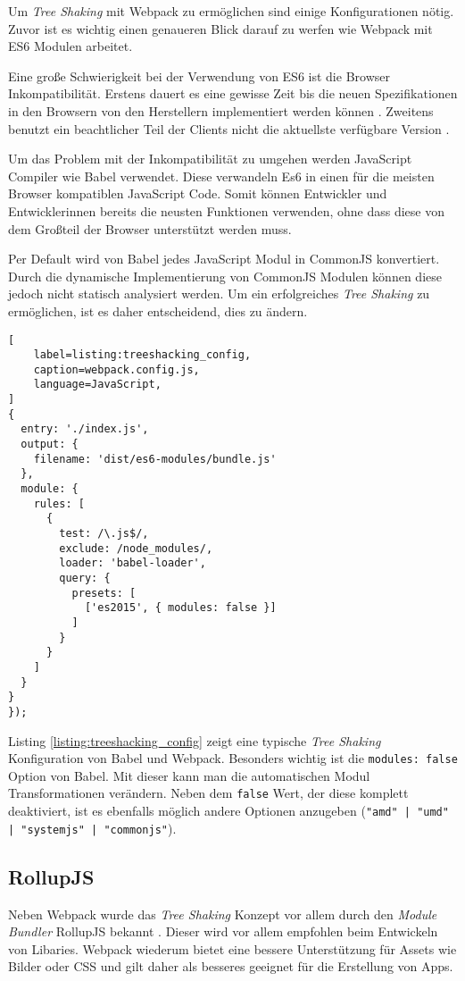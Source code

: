 Um \textit{Tree Shaking} mit Webpack zu ermöglichen sind einige Konfigurationen nötig. 
Zuvor ist es wichtig einen genaueren Blick darauf zu werfen wie Webpack mit ES6 Modulen arbeitet.

Eine große Schwierigkeit bei der Verwendung von ES6 ist die Browser Inkompatibilität. Erstens dauert es eine gewisse Zeit bis die neuen Spezifikationen in den Browsern von den Herstellern implementiert werden können \autocite{CanIUseES6}. Zweitens benutzt ein beachtlicher Teil der Clients nicht die aktuellste verfügbare Version \autocite{CanIUseUsageTable}.

Um das Problem mit der Inkompatibilität zu umgehen werden JavaScript Compiler wie Babel verwendet. Diese verwandeln Es6 in einen für die meisten Browser kompatiblen JavaScript Code. Somit können Entwickler und Entwicklerinnen bereits die neusten Funktionen verwenden, ohne dass diese von dem Großteil der Browser unterstützt werden muss.\autocite{Babel}

Per Default wird von Babel jedes JavaScript Modul in CommonJS konvertiert. Durch die dynamische Implementierung von CommonJS Modulen können diese jedoch nicht statisch analysiert werden. Um ein erfolgreiches \textit{Tree Shaking} zu ermöglichen, ist es daher entscheidend, dies zu ändern.\autocite{Babel}

\begin{lstlisting}[
    label=listing:treeshacking_config,
	caption=webpack.config.js,
	language=JavaScript,
]
{
  entry: './index.js',
  output: {
    filename: 'dist/es6-modules/bundle.js'
  },
  module: {
    rules: [
      {
        test: /\.js$/,
        exclude: /node_modules/,
        loader: 'babel-loader',
        query: {
          presets: [
            ['es2015', { modules: false }]
          ]
        }
      }
    ]
  }
}
});
\end{lstlisting}

Listing \ref{listing:treeshacking_config} zeigt eine typische \textit{Tree Shaking} Konfiguration von Babel und Webpack. Besonders wichtig ist die \lstinline{modules: false} Option von Babel. Mit dieser kann man die automatischen Modul Transformationen verändern. Neben dem \lstinline{false} Wert, der diese komplett deaktiviert, ist es ebenfalls möglich andere Optionen anzugeben (\lstinline{"amd" | "umd" | "systemjs" | "commonjs"}). \autocite{Babel}

\subsection{RollupJS}
Neben Webpack wurde das \textit{Tree Shaking} Konzept vor allem durch den \textit{Module Bundler} RollupJS bekannt \autocite{WebpackTreeShaking}. Dieser wird vor allem empfohlen beim Entwickeln von Libaries. Webpack wiederum bietet eine bessere Unterstützung für Assets wie Bilder oder CSS und gilt daher als besseres geeignet für die Erstellung von Apps. \autocite{RichHarris}

